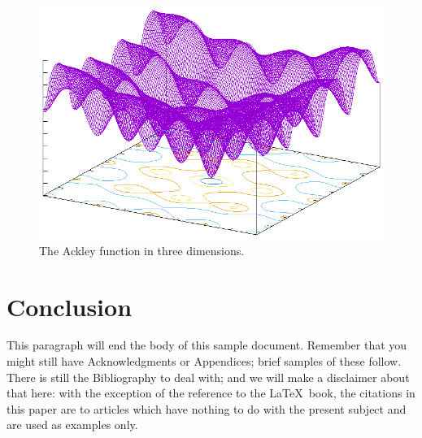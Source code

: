 \begin{figure}
  \includegraphics[width=\columnwidth]{../img/output/ackley}
  \caption{The Ackley function in three dimensions.}\label{fig:ackley}
\end{figure}


\section{Conclusion}
This paragraph will end the body of this sample document.
Remember that you might still have Acknowledgments or
Appendices; brief samples of these
follow.  There is still the Bibliography to deal with; and
we will make a disclaimer about that here: with the exception
of the reference to the \LaTeX\ book, the citations in
this paper are to articles which have nothing to
do with the present subject and are used as
examples only.


